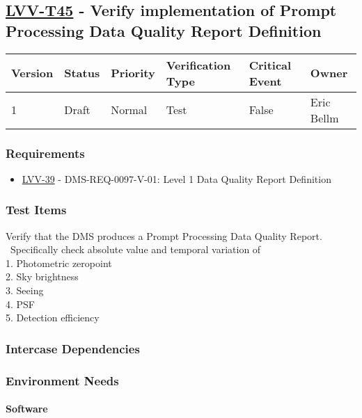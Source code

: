 \subsection{\href{https://jira.lsstcorp.org/secure/Tests.jspa\#/testCase/LVV-T45}{LVV-T45}
    - Verify implementation of Prompt Processing Data Quality Report Definition}\label{lvv-t45}

\begin{longtable}[]{llllll}
\toprule
Version & Status & Priority & Verification Type & Critical Event & Owner
\\\midrule
1 & Draft & Normal &
Test & False & Eric Bellm
\\\bottomrule
\end{longtable}

\subsubsection{Requirements}
\begin{itemize}
\item \href{https://jira.lsstcorp.org/browse/LVV-39}{LVV-39} - DMS-REQ-0097-V-01: Level 1 Data Quality Report Definition
\end{itemize}

\subsubsection{Test Items}
Verify that the DMS produces a Prompt Processing Data Quality Report.
~Specifically check absolute value and temporal variation of\\
1. Photometric zeropoint\\
2. Sky brightness\\
3. Seeing\\
4. PSF\\
5. Detection efficiency



\subsubsection{Intercase Dependencies}

\subsubsection{Environment Needs}

\paragraph{Software}

